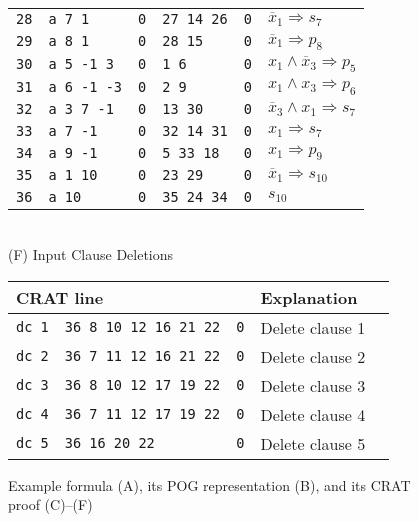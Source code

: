 \documentclass[letterpaper,USenglish,cleveref, autoref, thm-restate]{lipics-v2021}
\newcommand{\obar}[1]{\overline{#1}}
\newcommand{\imply}{\Rightarrow}
\begin{document}
\begin{figure}
\begin{minipage}{0.49\textwidth}
\begin{tabular}{llllll}
\texttt{28} & \texttt{a 7 1} & \texttt{0} & \texttt{27 14 26} & \texttt{0} & $\obar{x}_1 \imply s_7$  \\
\texttt{29} & \texttt{a 8 1} & \texttt{0} & \texttt{28 15} & \texttt{0} & $\obar{x}_1 \imply p_8$  \\
\texttt{30} & \texttt{a 5 -1 3} & \texttt{0} & \texttt{1 6} & \texttt{0} & $x_1 \land \obar{x}_3 \imply p_5$ \\
\texttt{31} & \texttt{a 6 -1 -3} & \texttt{0} & \texttt{2 9} & \texttt{0} & $x_1 \land x_3 \imply p_6$ \\
\texttt{32} & \texttt{a 3 7 -1} & \texttt{0} & \texttt{13 30} & \texttt{0} & $\obar{x}_3 \land x_1 \imply s_7$  \\
\texttt{33} & \texttt{a 7 -1} & \texttt{0} & \texttt{32 14 31} & \texttt{0} & $x_1 \imply s_7$  \\
\texttt{34} & \texttt{a 9 -1} & \texttt{0} & \texttt{5 33 18} & \texttt{0} & $x_1 \imply p_9$  \\
\texttt{35} & \texttt{a 1 10} & \texttt{0} & \texttt{23 29} & \texttt{0} & $\obar{x}_1 \imply s_{10}$  \\
\texttt{36} & \texttt{a 10} & \texttt{0} & \texttt{35 24 34} & \texttt{0} & $s_{10}$ \\
\bottomrule
\end{tabular}
\\[1.5ex]
(F) Input Clause Deletions\\[1.2ex]
\begin{tabular}{lllll}
  \toprule
 \multicolumn{3}{l}{CRAT line} & Explanation\\
\midrule
 \texttt{dc 1} & \texttt{36 8 10 12 16 21 22} & \texttt{0} & Delete clause 1 \\
 \texttt{dc 2} & \texttt{36 7 11 12 16 21 22} & \texttt{0} & Delete clause 2 \\
 \texttt{dc 3} & \texttt{36 8 10 12 17 19 22} & \texttt{0} & Delete clause 3 \\
 \texttt{dc 4} & \texttt{36 7 11 12 17 19 22} & \texttt{0} & Delete clause 4 \\
 \texttt{dc 5} & \texttt{36 16 20 22} & \texttt{0} &  Delete clause 5 \\
\bottomrule
\end{tabular}
\end{minipage}
\caption{Example formula (A), its POG representation (B), and its CRAT proof (C)--(F)}
\label{fig:eg4:all}
\end{figure}
\end{document}
